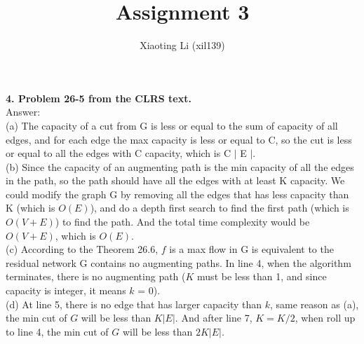 \documentclass{article}
\title{Assignment 3}
\author{Xiaoting Li (xil139)}
\date{}
\begin{document}
\maketitle
\textbf{4. Problem 26-5 from the CLRS text.} \\
\noindent
Answer: \\
(a) The capacity of a cut from G is less or equal to the sum of capacity of all edges, and for each edge the max capacity is less or equal to C, so the cut is less or equal to all the edges with C capacity, which is C $|$ E $|$.\\
\newline
(b) Since the capacity of an augmenting path is the min capacity of all the edges in the path, so the path should have all the edges with at least K capacity. We could modify the graph G by removing all the edges that has less capacity than K (which is $O(E)$), and do a depth first search to find the first path (which is $O(V+E)$) to find the path. And the total time complexity would be $O(V+E)$, which is $O(E)$.  \\
\newline
(c) According to the Theorem 26.6, $f$ is a max flow in G is equivalent to the residual network G contains no augmenting paths. In line 4, when the algorithm terminates, there is no augmenting path ($K$ must be less than 1, and since capacity is integer, it means $k$ = 0).\\
\newline
(d) At line 5, there is no edge that has larger capacity than $k$, same reason as (a), the min cut of $G$ will be less than $K |E|$. And after line 7, $K = K/2$, when roll up to line 4, the min cut of $G$ will be less than $2K |E|$.\\
\newline
\end{document}
